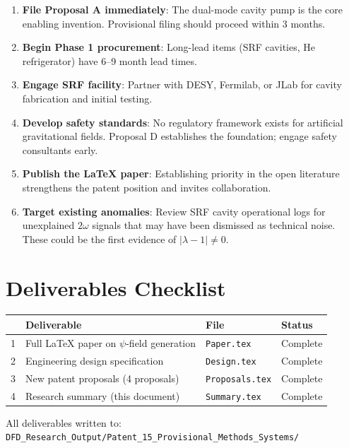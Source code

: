 \documentclass[11pt,a4paper]{article}
\begin{document}
\begin{enumerate}
\item \textbf{File Proposal A immediately}: The dual-mode cavity
pump is the core enabling invention.  Provisional filing should
proceed within 3 months.

\item \textbf{Begin Phase 1 procurement}: Long-lead items (SRF
cavities, He refrigerator) have 6--9 month lead times.

\item \textbf{Engage SRF facility}: Partner with DESY, Fermilab,
or JLab for cavity fabrication and initial testing.

\item \textbf{Develop safety standards}: No regulatory framework
exists for artificial gravitational fields.  Proposal D establishes
the foundation; engage safety consultants early.

\item \textbf{Publish the LaTeX paper}: Establishing priority in
the open literature strengthens the patent position and invites
collaboration.

\item \textbf{Target existing anomalies}: Review SRF cavity
operational logs for unexplained $2\omega$ signals that may
have been dismissed as technical noise.  These could be the
first evidence of $|\lambda - 1| \neq 0$.
\end{enumerate}

\section{Deliverables Checklist}

\begin{longtable}{p{}p{}p{}p{}}
\toprule
& \textbf{Deliverable} & \textbf{File} & \textbf{Status} \\
\midrule
\endhead
1 & Full LaTeX paper on $\psi$-field generation &
\texttt{Paper.tex} & Complete \\
2 & Engineering design specification &
\texttt{Design.tex} & Complete \\
3 & New patent proposals (4 proposals) &
\texttt{Proposals.tex} & Complete \\
4 & Research summary (this document) &
\texttt{Summary.tex} & Complete \\
\bottomrule
\end{longtable}

All deliverables written to:\\
\texttt{DFD\_Research\_Output/Patent\_15\_Provisional\_Methods\_Systems/}
\end{document}
